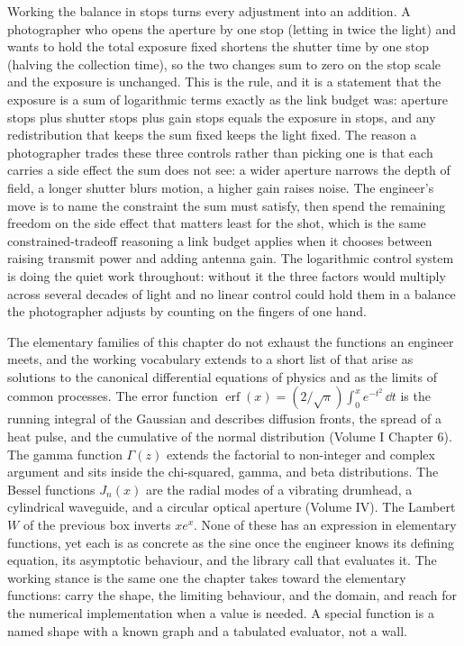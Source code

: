 Working the balance in stops turns every adjustment into an addition.
A photographer who opens the aperture by one stop (letting in twice the
light) and wants to hold the total exposure fixed shortens the shutter
time by one stop (halving the collection time), so the two changes sum
to zero on the stop scale and the exposure is unchanged. This is the
 rule, and it is a statement that the exposure is a
sum of logarithmic terms exactly as the link budget was: aperture stops
plus shutter stops plus gain stops equals the exposure in stops, and any
redistribution that keeps the sum fixed keeps the light fixed. The
reason a photographer trades these three controls rather than picking
one is that each carries a side effect the sum does not see: a wider
aperture narrows the depth of field, a longer shutter blurs motion, a
higher gain raises noise. The engineer's move is to name the constraint
the sum must satisfy, then spend the remaining freedom on the side
effect that matters least for the shot, which is the same
constrained-tradeoff reasoning a link budget applies when it chooses
between raising transmit power and adding antenna gain. The logarithmic
control system is doing the quiet work throughout: without it the three
factors would multiply across several decades of light and no linear
control could hold them in a balance the photographer adjusts by
counting on the fingers of one hand.



\begin{mastery}
The elementary families of this chapter do not exhaust the functions
an engineer meets, and the working vocabulary extends to a short list
of  that arise as solutions to the
canonical differential equations of physics and as the limits of
common processes. The error function $\operatorname{erf}(x) =
(2/\sqrt{\pi}) \int_{0}^{x} e^{-t^{2}}\,\dd t$ is the running integral
of the Gaussian and describes diffusion fronts, the spread of a
heat pulse, and the cumulative of the normal distribution (Volume I
Chapter 6). The gamma function $\Gamma(z)$ extends the factorial to
non-integer and complex argument and sits inside the chi-squared,
gamma, and beta distributions. The Bessel functions $J_{n}(x)$ are
the radial modes of a vibrating drumhead, a cylindrical waveguide,
and a circular optical aperture (Volume IV). The Lambert $W$ of the
previous box inverts $x e^{x}$. None of these has an expression in
elementary functions, yet each is as concrete as the sine once the
engineer knows its defining equation, its asymptotic behaviour, and
the library call that evaluates it. The working stance is the same one
the chapter takes toward the elementary functions: carry the shape,
the limiting behaviour, and the domain, and reach for the numerical
implementation when a value is needed. A special function is a named
shape with a known graph and a tabulated evaluator, not a wall.
\end{mastery}

